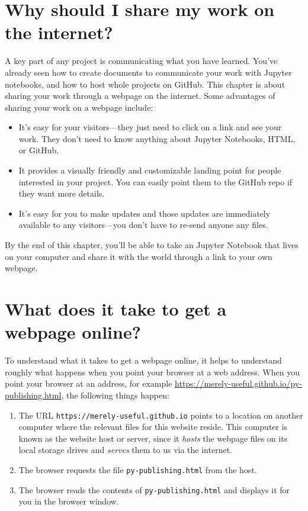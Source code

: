 \documentclass[]{Nemilov}
\providecommand{\tightlist}{%
  \setlength{\itemsep}{0pt}\setlength{\parskip}{0pt}}
\begin{document}
\hypertarget{why-should-i-share-my-work-on-the-internet}{%
\section{Why should I share my work on the internet?}\label{why-should-i-share-my-work-on-the-internet}}

A key part of any project is communicating what you have learned.
You've already seen how to create documents to communicate your work with Jupyter notebooks,
and how to host whole projects on GitHub.
This chapter is about sharing your work through a webpage on the internet.
Some advantages of sharing your work on a webpage include:

\begin{itemize}
\tightlist
\item
  It's easy for your visitors---they just need to click on a link and see your work.
  They don't need to know anything about Jupyter Notebooks, HTML, or GitHub.
\item
  It provides a visually friendly and customizable landing point for people interested in your project.
  You can easily point them to the GitHub repo if they want more details.
\item
  It's easy for you to make updates and those updates are immediately available
  to any visitors---you don't have to re-send anyone any files.
\end{itemize}

By the end of this chapter,
you'll be able to take an Jupyter Notebook that lives on your computer
and share it with the world through a link to your own webpage.

\hypertarget{what-does-it-take-to-get-a-webpage-online}{%
\section{What does it take to get a webpage online?}\label{what-does-it-take-to-get-a-webpage-online}}

To understand what it takes to get a webpage online,
it helps to understand roughly what happens when you point your browser at a web address.
When you point your browser at an address,
for example \url{https://merely-useful.github.io/py-publishing.html},
the following things happen:

\begin{enumerate}
\def\labelenumi{\arabic{enumi}.}
\tightlist
\item
  The URL \texttt{https://merely-useful.github.io} points to a location on another computer
  where the relevant files for this website reside.
  This computer is known as the website host or server,
  since it \emph{hosts} the webpage files on its local storage drives
  and \emph{serves} them to us via the internet.
\item
  The browser requests the file \texttt{py-publishing.html} from the host.
\item
  The browser reads the contents of \texttt{py-publishing.html} and displays it for you in the browser window.
\end{enumerate}
\end{document}
